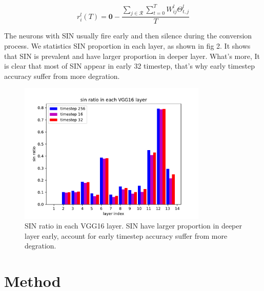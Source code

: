 \documentclass{article}
\begin{document}
\begin{equation}
  r_i^l(T) = \mathbf{0} - \frac{\sum_{j \in \mathcal{R}} \sum_{t=0}^TW_{ij}^l\Theta_{t,j}^l }{T}
\end{equation}

The neurons with SIN usually fire early and then silence during the conversion process.
We statistics SIN proportion in each layer, as shown in fig 2. It shows that SIN is prevalent and have larger proportion in deeper layer.
What's more, It is clear that most of SIN appear in early 32 timestep, that's why early timestep accuracy suffer from more degration.
\begin{figure}[htbp]
  \centering
  \includegraphics[width=0.8\textwidth]{./fig/sin_ratio.pdf}
  \caption{SIN ratio in each VGG16 layer. SIN have larger proportion in deeper layer early, account for early timestep accuracy suffer from more degration.}
\end{figure}

\section{Method}
\end{document}
